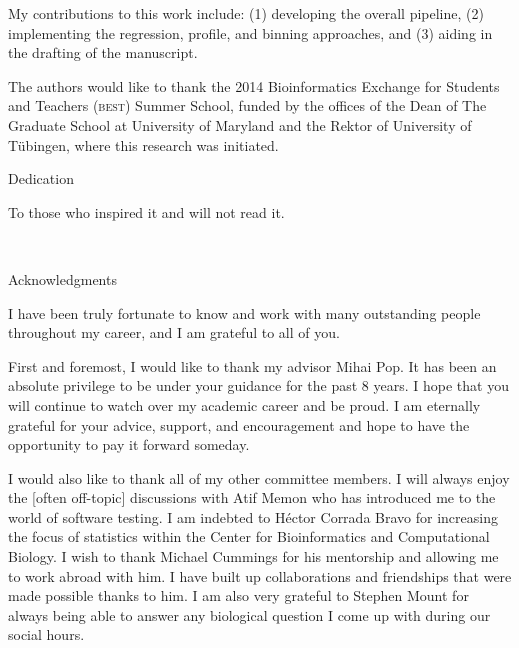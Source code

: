 \documentclass[12pt,\mydriver]{thesis}
\begin{document}
My contributions to this work include: (1) developing the overall pipeline, (2) implementing the regression, profile, and binning approaches, and (3) aiding in the drafting of the manuscript.

The authors would like to thank the 2014 Bioinformatics
Exchange for Students and Teachers (\textsc{best}) Summer School,
funded by the offices of the Dean of The Graduate School at University
of Maryland and the Rektor of University of T\"{u}bingen, where this
research was initiated.
\clearpage{}  
\clearpage{}
\renewcommand{\baselinestretch}{2}
\small\normalsize
\hbox{\ }

\vspace{-.65in}

\begin{center}
\large{Dedication}
\end{center}

To those who inspired it and will not read it.

\clearpage{} 
\clearpage{}
\renewcommand{\baselinestretch}{2}
\small\normalsize
\hbox{\ }

\vspace{-.65in}

\begin{center}
\large{Acknowledgments}
\end{center}

\vspace{1ex}

I have been truly fortunate to know and work with many outstanding people throughout my career, and I am grateful to all of you.

First and foremost, I would like to thank my advisor Mihai Pop.
It has been an absolute privilege to be under your guidance for the past 8 years.
I hope that you will continue to watch over my academic career and be proud.
I am eternally grateful for your advice, support, and encouragement and hope to have the opportunity to pay it forward someday.

I would also like to thank all of my other committee members. I will always enjoy the [often off-topic] discussions with Atif Memon who has introduced me to the world of software testing.
I am indebted to H\'{e}ctor Corrada Bravo for increasing the focus of statistics within the Center for Bioinformatics and Computational Biology.
I wish to thank Michael Cummings for his mentorship and allowing me to work abroad with him.
I have built up collaborations and friendships that were made possible thanks to him.
I am also very grateful to Stephen Mount for always being able to answer any biological question I come up with during our social hours.
\end{document}
